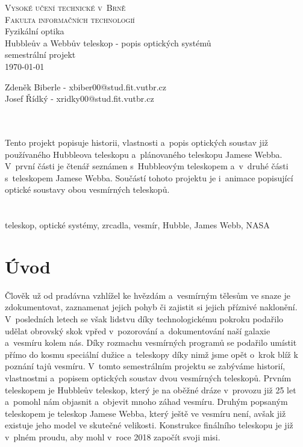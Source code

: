 \documentclass[a4paper,11pt]{article}
\begin{document}
\begin{titlepage}
\begin{center}
\Huge
\textsc{Vysoké učení technické v~Brně\\ \huge Fakulta informačních technologií}\\
\Huge Fyzikální optika \\ 
\LARGE Hubbleův a Webbův teleskop - popis optických systémů  \\
semestrální projekt \\
\today
{}
\end{center}
\Large Zdeněk Biberle - xbiber00@stud.fit.vutbr.cz \\ Josef Řídký - xridky00@stud.fit.vutbr.cz
\end{titlepage}
\newpage

\Large{}\\
\normalsize\noindent\\ Tento projekt popisuje historii, vlastnosti a~popis optických soustav již používaného Hubbleova teleskopu a~plánovaného teleskopu Jamese Webba. V~první části je čtenář seznámen s~Hubbleovým teleskopem a~v~druhé části s~teleskopem Jamese Webba. Součástí tohoto projektu je i~animace popisující optické soustavy obou vesmírných teleskopů.\\
\\
\Large{}\\
\normalsize\noindent teleskop, optické systémy, zrcadla, vesmír, Hubble, James Webb, NASA\\
\newpage

\tableofcontents

\newpage


\section{Úvod}
Člověk už od pradávna vzhlížel ke hvězdám a~vesmírným tělesům ve snaze je zdokumentovat, zaznamenat jejich pohyb či zajistit si jejich příznivé naklonění. V~posledních letech se však lidstvu díky technologickému pokroku podařilo udělat obrovský skok vpřed v~pozorování a~dokumentování naší galaxie a~vesmíru kolem nás. Díky rozmachu vesmírných programů se podařilo umístit přímo do kosmu speciální dužice a~teleskopy díky nimž jsme opět o~krok blíž k poznání tajů vesmíru. V~tomto semestrálním projektu se zabýváme historií, vlastnostmi a~popisem optických soustav dvou vesmírných teleskopů. Prvním teleskopem je Hubbleův teleskop, který je na oběžné dráze v~provozu již 25 let a~pomohl nám objasnit a~objevit mnoho záhad vesmíru. Druhým popsaným teleskopem je teleskop Jamese Webba, který ještě ve vesmíru není, avšak již existuje jeho model ve skutečné velikosti. Konstrukce finálního teleskopu je již v~plném proudu, aby mohl v~roce 2018 započít svoji misi. 
\end{document}
